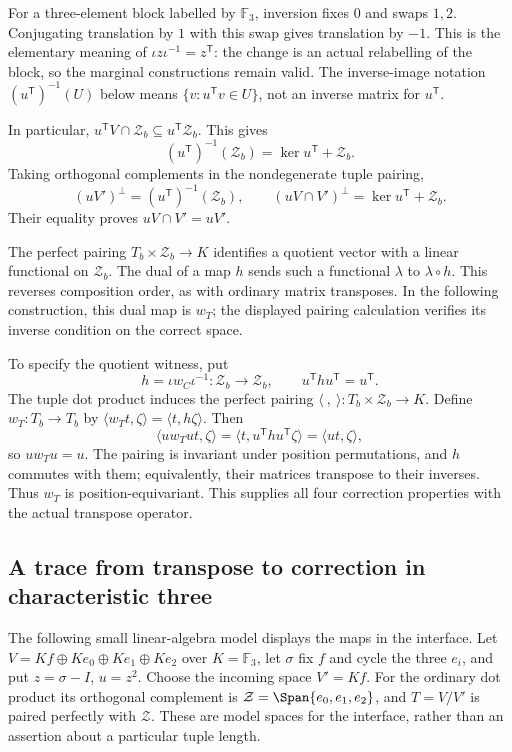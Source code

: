 \documentclass[11pt,a4paper,oneside,openany]{book}
\theoremstyle{definition}\newtheorem{definition}[theorem]{Definition}
\theoremstyle{remark}\newtheorem{remark}[theorem]{Remark}
\numberwithin{equation}{chapter}
\begin{document}
For a three-element block labelled by $\mathbb F_3$, inversion fixes
$0$ and swaps $1,2$. Conjugating translation by $1$ with this swap
gives translation by $-1$. This is the elementary meaning of
$\iota z\iota^{-1}=z^{\mathsf T}$: the change is an actual
relabelling of the block, so the marginal constructions remain valid.
The inverse-image notation $(u^{\mathsf T})^{-1}(U)$ below means
$\{v:u^{\mathsf T}v\in U\}$, not an inverse matrix for $u^{\mathsf T}$.

In particular,
$u^{\mathsf T}V\cap\mathcal Z_b\subseteq
u^{\mathsf T}\mathcal Z_b$. This gives
\[
 (u^{\mathsf T})^{-1}(\mathcal Z_b)
                   =\ker u^{\mathsf T}+\mathcal Z_b.
\]
Taking orthogonal complements in the nondegenerate tuple pairing,
\[
 (uV')^\perp=(u^{\mathsf T})^{-1}(\mathcal Z_b),\qquad
 (uV\cap V')^\perp=\ker u^{\mathsf T}+\mathcal Z_b.
\]
Their equality proves $uV\cap V'=uV'$.

The perfect pairing $T_b\times\mathcal Z_b\to K$ identifies a
quotient vector with a linear functional on $\mathcal Z_b$.
The dual of a map $h$ sends such a functional $\lambda$ to
$\lambda\circ h$. This reverses composition order, as with ordinary
matrix transposes. In the following construction, this dual map is
$w_T$; the displayed pairing calculation verifies its inverse
condition on the correct space.

To specify the quotient witness, put
\[
 h=\iota w_C\iota^{-1}:\mathcal Z_b\longrightarrow\mathcal Z_b,
                  \qquad u^{\mathsf T}hu^{\mathsf T}=u^{\mathsf T}.
\]
The tuple dot product induces the perfect pairing
$\langle\ ,\ \rangle:T_b\times\mathcal Z_b\to K$.
Define $w_T:T_b\to T_b$ by
$\langle w_Tt,\zeta\rangle=\langle t,h\zeta\rangle$.
Then
\[
 \langle uw_Tut,\zeta\rangle
 =\langle t,u^{\mathsf T}hu^{\mathsf T}\zeta\rangle
 =\langle ut,\zeta\rangle,
\]
so $uw_Tu=u$. The pairing is invariant under position permutations,
and $h$ commutes with them; equivalently, their matrices transpose to
their inverses. Thus $w_T$ is position-equivariant. This supplies all
four correction properties with the actual transpose operator.

\subsection{A trace from transpose to correction in characteristic three}
The following small linear-algebra model displays the maps in the
interface. Let $V=Kf\oplus Ke_0\oplus Ke_1\oplus Ke_2$ over
$K=\mathbb F_3$, let $\sigma$ fix $f$ and cycle the three $e_i$, and
put $z=\sigma-I$, $u=z^2$. Choose the incoming space $V'=Kf$.
For the ordinary dot product its orthogonal complement is
$\mathcal Z=\Span\{e_0,e_1,e_2\}$, and $T=V/V'$ is paired perfectly
with $\mathcal Z$. These are model spaces for the interface, rather
than an assertion about a particular tuple length.
\end{document}
